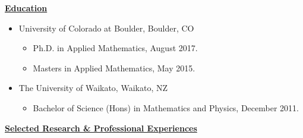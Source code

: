  {\bf{\underline{Education}}}

  \begin{itemize}
\setlength{\itemsep}{0.2pt}
  \item University of Colorado at Boulder, Boulder, CO
\begin{itemize}
\item Ph.D. in Applied Mathematics, August 2017.
\item Masters in Applied Mathematics, May 2015.
\end{itemize}
\item The University of Waikato, Waikato, NZ
\begin{itemize}
\item Bachelor of Science (Hons) in Mathematics and Physics, December 2011. 
\end{itemize}
  \end{itemize}
  
{\bf {\underline{Selected Research \& Professional Experiences}}}
  
